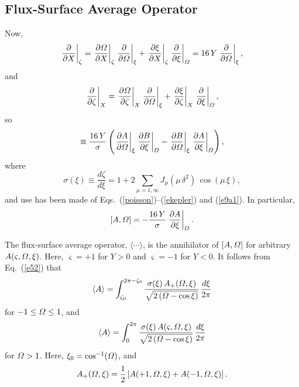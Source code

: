 \documentclass[12pt,prb,aps]{revtex4-1}
\begin{document}
\subsection{Flux-Surface Average Operator}
Now, 
\begin{equation}\label{e49}
\left.\frac{\partial}{\partial X}\right|_\zeta= \left.\frac{\partial{\mit\Omega}}{\partial X}\right|_\zeta\left.\frac{\partial}{\partial{\mit\Omega}}\right|_{\xi}+ \left.\frac{\partial\xi}{\partial X}\right|_\zeta\left.\frac{\partial}{\partial\xi}\right|_{\mit\Omega}=16\,Y\left.\frac{\partial}{\partial{\mit\Omega}}\right|_{\xi},
\end{equation}
and
\begin{equation}
\left.\frac{\partial}{\partial \zeta}\right|_X= \left.\frac{\partial{\mit\Omega}}{\partial \zeta}\right|_X\left.\frac{\partial}{\partial{\mit\Omega}}\right|_{\xi}+ \left.\frac{\partial\xi}{\partial \zeta}\right|_X\left.\frac{\partial}{\partial\xi}\right|_{\mit\Omega},
\end{equation}
so
\begin{equation}
[A,B] \equiv \frac{16\,Y}{\sigma}\left(\left.\frac{\partial A}{\partial{\mit\Omega}}\right|_\xi\left.\frac{\partial B}{\partial\xi}\right|_{\mit\Omega}-\left.\frac{\partial B}{\partial{\mit\Omega}}\right|_\xi\left.\frac{\partial A}{\partial\xi}\right|_{\mit\Omega}\right),
\end{equation}
where
\begin{equation}\label{sigma}
\sigma(\xi) \equiv\frac{d\zeta}{d\xi}=  1+2\sum_{\mu=1,\infty} J_\mu(\mu\,\delta^2)\,\cos(\mu\,\xi),
\end{equation}
and use has been made of Eqs.~(\ref{poisson})--(\ref{ekepler}) and (\ref{e9a1}). 
In particular,
\begin{equation}\label{e52}
[A,{\mit\Omega}] = -\frac{16\,Y}{\sigma}\left.\frac{\partial A}{\partial\xi}\right|_{\mit\Omega}.
\end{equation}

The flux-surface average operator, $\langle\cdots\rangle$, is the annihilator of $[A,{\mit\Omega}]$ for arbitrary $A(\varsigma,{\mit\Omega},\xi)$.\cite{ntm2,island} Here, $\varsigma=+1$ for $Y>0$ and $\varsigma =-1$ for
$Y<0$. It follows from Eq.~(\ref{e52}) that
\begin{equation}
\langle A\rangle = \int_{\zeta_0}^{2\pi-\zeta_0}\frac{\sigma(\xi)\,A_+({\mit\Omega},\xi)}{\sqrt{2\,({\mit\Omega}-\cos\xi)}}\,\frac{d\xi}{2\pi}
\end{equation}
for $-1\leq {\mit\Omega}\leq 1$, and
\begin{equation}\label{e55}
\langle A\rangle = \int_0^{2\pi}\frac{\sigma(\xi)\,A(\varsigma,{\mit\Omega},\xi)}{\sqrt{2\,({\mit\Omega}-\cos\xi)}}\,\frac{d\xi}{2\pi}
\end{equation}
for ${\mit\Omega}>1$. Here, $\xi_0=\cos^{-1}({\mit\Omega})$, and
\begin{equation}
A_+({\mit\Omega},\xi)= \frac{1}{2}\left[A(+1,{\mit\Omega},\xi) + A(-1,{\mit\Omega},\xi)\right].
\end{equation}
\end{document}
